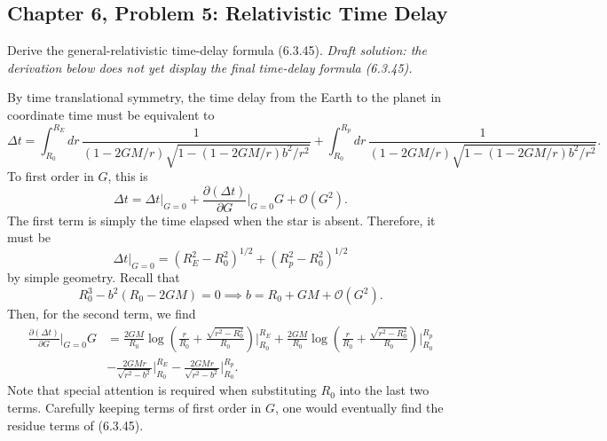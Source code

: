 \subsection{Chapter 6, Problem 5: Relativistic Time Delay}

Derive the general-relativistic time-delay formula (6.3.45).
\emph{Draft solution: the derivation below does not yet display the final time-delay formula (6.3.45).}
\begin{solution}
    By time translational symmetry, the time delay from the Earth to the planet in coordinate time must be equivalent to
    \begin{equation}
        \Delta t = \int^{R_E}_{R_0} dr\, \frac{1}{(1-2GM/r)\sqrt{1-(1-2GM/r)b^2/r^2}} + \int^{R_p}_{R_0} dr\, \frac{1}{(1-2GM/r)\sqrt{1-(1-2GM/r)b^2/r^2}}.
    \end{equation}
    To first order in $G$, this is
    \begin{equation}
        \Delta t = \Delta t \bigg|_{G=0} + \frac{\partial (\Delta t)}{\partial G}\bigg|_{G=0}G + \mathcal{O}(G^2).
    \end{equation}
    The first term is simply the time elapsed when the star is absent. Therefore, it must be
    \begin{equation}
        \Delta t \bigg|_{G=0} = (R_E^2-R_0^2)^{1/2} + (R_p^2 - R_0^2)^{1/2}
    \end{equation}
    by simple geometry. Recall that
    \begin{equation}
        R_0^3 - b^2(R_0-2GM) = 0 \implies b = R_0 + GM + \mathcal{O}(G^2).
    \end{equation}
    Then, for the second term, we find
    \begin{equation}
    \begin{aligned}
        \frac{\partial (\Delta t)}{\partial G}\bigg|_{G=0}G &= \frac{2GM}{R_0}\log\left(\frac{r}{R_0} + \frac{\sqrt{r^2-R_0^2}}{R_0}\right)\bigg|^{R_E}_{R_0}+\frac{2GM}{R_0}\log\left(\frac{r}{R_0} + \frac{\sqrt{r^2-R_0^2}}{R_0}\right)\bigg|^{R_p}_{R_0}\\
        \qquad &-\frac{2GMr}{\sqrt{r^2 -b^2}}\bigg|^{R_E}_{R_0}-\frac{2GMr}{\sqrt{r^2 -b^2}}\bigg|^{R_p}_{R_0}.
    \end{aligned}
    \end{equation}
    Note that special attention is required when substituting $R_0$ into the last two terms. Carefully keeping terms of first order in $G$, one would eventually find the residue terms of (6.3.45).
\end{solution}

